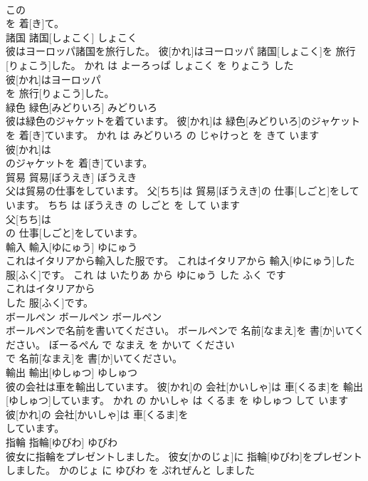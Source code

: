 \documentclass[8pt]{extreport}
\begin{document}
\begin{CJK}{UTF8}{min}
\\	この
\\	を 着[き]て。		
\\	諸国	諸国[しょこく]	しょこく	
\\	彼はヨーロッパ諸国を旅行した。	彼[かれ]はヨーロッパ 諸国[しょこく]を 旅行[りょこう]した。	かれ は よーろっぱ しょこく を りょこう した	
\\	彼[かれ]はヨーロッパ
\\	を 旅行[りょこう]した。		
\\	緑色	緑色[みどりいろ]	みどりいろ	
\\	彼は緑色のジャケットを着ています。	彼[かれ]は 緑色[みどりいろ]のジャケットを 着[き]ています。	かれ は みどりいろ の じゃけっと を きて います	
\\	彼[かれ]は
\\	のジャケットを 着[き]ています。		
\\	貿易	貿易[ぼうえき]	ぼうえき	
\\	父は貿易の仕事をしています。	父[ちち]は 貿易[ぼうえき]の 仕事[しごと]をしています。	ちち は ぼうえき の しごと を して います	
\\	父[ちち]は
\\	の 仕事[しごと]をしています。		
\\	輸入	輸入[ゆにゅう]	ゆにゅう	
\\	これはイタリアから輸入した服です。	これはイタリアから 輸入[ゆにゅう]した 服[ふく]です。	これ は いたりあ から ゆにゅう した ふく です	
\\	これはイタリアから
\\	した 服[ふく]です。		
\\	ボールペン	ボールペン	ボールペン	
\\	ボールペンで名前を書いてください。	ボールペンで 名前[なまえ]を 書[か]いてください。	ぼーるぺん で なまえ を かいて ください	
\\	で 名前[なまえ]を 書[か]いてください。		
\\	輸出	輸出[ゆしゅつ]	ゆしゅつ	
\\	彼の会社は車を輸出しています。	彼[かれ]の 会社[かいしゃ]は 車[くるま]を 輸出[ゆしゅつ]しています。	かれ の かいしゃ は くるま を ゆしゅつ して います	
\\	彼[かれ]の 会社[かいしゃ]は 車[くるま]を
\\	しています。		
\\	指輪	指輪[ゆびわ]	ゆびわ	
\\	彼女に指輪をプレゼントしました。	彼女[かのじょ]に 指輪[ゆびわ]をプレゼントしました。	かのじょ に ゆびわ を ぷれぜんと しました	

\end{CJK}
\end{document}
